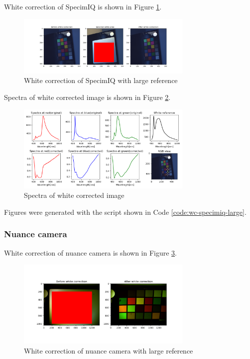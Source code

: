 White correction of SpecimIQ is shown in Figure \ref{fig:wc-specimiq-large}.

\begin{figure}[H]
    \centering
    \caption{White correction of SpecimIQ with large reference}
    \label{fig:wc-specimiq-large}
    \includegraphics[width=0.75\textwidth]{./fig-task1/wc-specimiq-large.png}
\end{figure}

Spectra of white corrected image is shown in Figure \ref{fig:wc-specimiq-large-spectra}.

\begin{figure}[H]
    \centering
    \caption{Spectra of white corrected image}
    \label{fig:wc-specimiq-large-spectra}
    \includegraphics[width=0.75\textwidth]{./fig-task1/wc-specimiq-large-spectra.png}
\end{figure}

Figures were generated with the script shown in Code \ref{code:wc-specimiq-large}.

\subsubsection{Nuance camera}
White correction of nuance camera is shown in Figure \ref{fig:wc-nuance-camera-large}.

\begin{figure}[H]
    \centering
    \caption{White correction of nuance camera with large reference}
    \label{fig:wc-nuance-camera-large}
    \includegraphics[width=0.75\textwidth]{./fig-task1/wc-nuance-large.png}
\end{figure}

